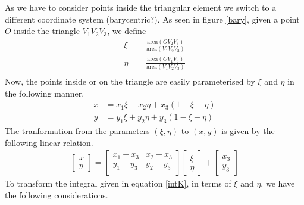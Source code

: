 \documentclass{article}
\begin{document}
As we have to consider points inside the triangular element
we switch to a different coordinate system (barycentric?).
As seen in figure \ref{bary},
given a point $O$ inside the triangle $V_1V_2V_3$,
we define
\begin{align*}
  \xi &= \frac{\text{area}(OV_2V_3)}{\text{area}(V_1V_2V_3)} \\
  \eta &= \frac{\text{area}(OV_1V_3)}{\text{area}(V_1V_2V_3)} \\
\end{align*}
Now, the points inside or on the triangle
are easily parameterised by $\xi$ and $\eta$
in the following manner.
\begin{align}
  x &= x_1 \xi + x_2 \eta + x_3 (1 - \xi - \eta) \label{x}\\
  y &= y_1 \xi + y_2 \eta + y_3 (1 - \xi - \eta) \label{y}
\end{align}
The tranformation from the parameters $(\xi,\eta)$
to $(x,y)$ is given by the following linear relation.
\begin{align}
  \begin{bmatrix} x \\ y \end{bmatrix} =
  \begin{bmatrix}
    x_1 - x_3 & x_2 - x_3 \\
    y_1 - y_3 & y_2 - y_3 \\
  \end{bmatrix}
  \begin{bmatrix} \xi \\ \eta \end{bmatrix}
  + \begin{bmatrix} x_3 \\ y_3 \end{bmatrix}
  \label{xy}
\end{align}
To transform the integral given in equation \ref{intK},
in terms of $\xi$ and $\eta$,
we have the following considerations.
\end{document}
